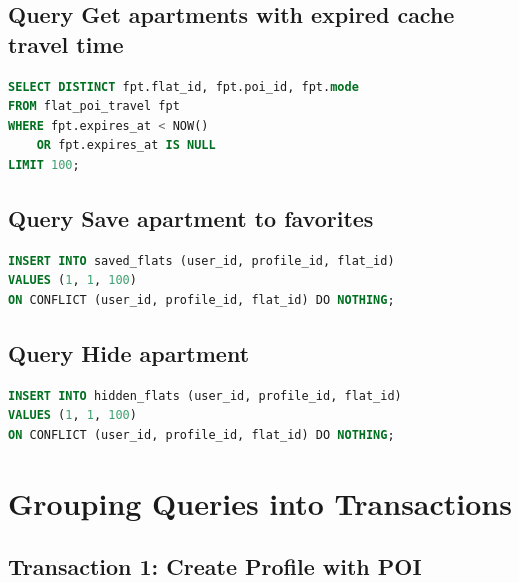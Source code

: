 \documentclass[12pt,a4paper]{article}
\begin{document}
\subsection{Query Get apartments with expired cache travel time}

\begin{lstlisting}[language=SQL, caption=Search records for travel time recalculation]
SELECT DISTINCT fpt.flat_id, fpt.poi_id, fpt.mode
FROM flat_poi_travel fpt
WHERE fpt.expires_at < NOW()
    OR fpt.expires_at IS NULL
LIMIT 100;
\end{lstlisting}

\subsection{Query Save apartment to favorites}

\begin{lstlisting}[language=SQL, caption=Add apartment to favorites]
INSERT INTO saved_flats (user_id, profile_id, flat_id)
VALUES (1, 1, 100)
ON CONFLICT (user_id, profile_id, flat_id) DO NOTHING;
\end{lstlisting}

\subsection{Query Hide apartment}

\begin{lstlisting}[language=SQL, caption=Hide apartment from user]
INSERT INTO hidden_flats (user_id, profile_id, flat_id)
VALUES (1, 1, 100)
ON CONFLICT (user_id, profile_id, flat_id) DO NOTHING;
\end{lstlisting}

\section{Grouping Queries into Transactions}

\subsection{Transaction 1: Create Profile with POI}
\end{document}
